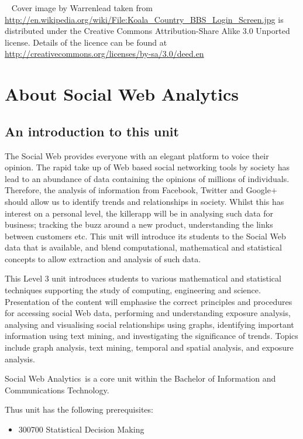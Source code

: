 \documentclass[a4paper,oneside]{book}
\newcommand{\unitname}{Social Web Analytics}
\begin{document}
~
\vfill
\noindent
Cover image by Warrenlead taken from
\url{http://en.wikipedia.org/wiki/File:Koala_Country_BBS_Login_Screen.jpg}
is distributed under the Creative Commons Attribution-Share Alike 3.0 Unported 
license. Details of the licence can be found at
\url{http://creativecommons.org/licenses/by-sa/3.0/deed.en}

\newpage

\tableofcontents

\chapter{About \unitname}

\section{An introduction to this unit}


The Social Web provides everyone with an elegant platform to voice
their opinion. The rapid take up of Web based social networking tools
by society has lead to an abundance of data containing the opinions of
millions of individuals.  Therefore, the analysis of information from
Facebook, Twitter and Google+ should allow us to identify trends and
relationships in society. Whilst this has interest on a personal
level, the killer­app will be in analysing such data for business;
tracking the buzz around a new product, understanding the links
between customers etc. This unit will introduce its students to the
Social Web data that is available, and blend computational,
mathematical and statistical concepts to allow extraction and analysis
of such data.

This Level 3 unit introduces students to various mathematical and
statistical techniques supporting the study of computing, engineering
and science. Presentation of the content will emphasise the correct
principles and procedures for accessing social Web data, performing
and understanding exposure analysis, analysing and visualising social
relationships using graphs, identifying important information using
text mining, and investigating the significance of trends. Topics
include graph analysis, text mining, temporal and spatial analysis,
and exposure analysis.


\unitname~is a core unit within the Bachelor of Information and
Communications Technology. 

Thus unit has the following prerequisites:
\begin{itemize}
\item 300700 Statistical Decision Making
\end{itemize}
\end{document}
